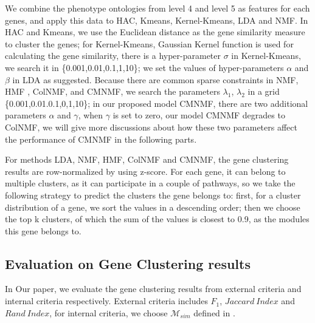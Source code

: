 \documentclass{bmcart}
\begin{document}
We combine the phenotype ontologies from level 4 and level 5 as features for each genes, and apply this data to HAC, Kmeans, Kernel-Kmeans, LDA and NMF. In HAC and Kmeans, we use the Euclidean distance as the gene similarity measure to cluster the genes; for Kernel-Kmeans, Gaussian Kernel function is used for calculating the gene similarity, there is a hyper-parameter $\sigma$ in Kernel-Kmeans, we search it in \{0.001,0.01,0.1,1,10\}; we set the values of hyper-parameters $\alpha$ and $\beta$ in LDA as \cite{Wei2006} suggested. Because there are common sparse constraints in NMF, HMF , ColNMF, and CMNMF, we search the parameters $\lambda_1$, $\lambda_2$ in a grid \{0.001,0.01.0.1,0,1,10\}; in our proposed model CMNMF, there are two additional parameters $\alpha$ and $\gamma$, when $\gamma$ is set to zero, our model CMNMF degrades to ColNMF, we will give more discussions about how these two parameters affect the performance of CMNMF in the following parts.

For methods LDA, NMF, HMF, ColNMF and CMNMF, the gene clustering results are row-normalized by using z-score. For each gene, it can belong to multiple clusters, as it can participate in a couple of pathways, so we take the following strategy to predict the clusters the gene belongs to: first, for a cluster distribution of a gene, we sort the values in a descending order; then we choose the top k clusters, of which the sum of the values is closest to 0.9, as the modules this gene belongs to.
\subsection*{\textbf{Evaluation on Gene Clustering results}}
In Our paper, we evaluate the gene clustering results from external criteria and internal criteria respectively. External criteria includes $F_1$, $Jaccard\ Index$ and $Rand\ Index$, for internal criteria, we choose $\mathcal{M}_{sim}$ defined in \cite{Bordino2010}. 
\end{document}
